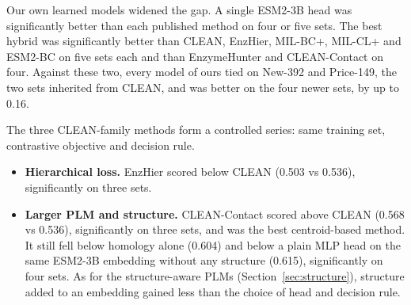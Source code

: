 \documentclass[11pt]{article}
\begin{document}
Our own learned models widened the gap. A single ESM2-3B head was significantly better than each published method on
four or five sets. The best hybrid was significantly better than CLEAN, EnzHier, MIL-BC+, MIL-CL+ and ESM2-BC on five
sets each and than EnzymeHunter and CLEAN-Contact on four. Against these two, every model of ours tied on New-392 and
Price-149, the two sets inherited from CLEAN, and was better on the four newer sets, by up to 0.16.

The three CLEAN-family methods form a controlled series: same training set, contrastive objective and decision rule.
\begin{itemize}
  \item \textbf{Hierarchical loss.} EnzHier scored below CLEAN (0.503 vs 0.536), significantly on three sets.
  \item \textbf{Larger PLM and structure.} CLEAN-Contact scored above CLEAN (0.568 vs 0.536), significantly on three
        sets, and was the best centroid-based method. It still fell below homology alone (0.604) and below a plain MLP
        head on the same ESM2-3B embedding without any structure (0.615), significantly on four sets. As for the
        structure-aware PLMs (Section~\ref{sec:structure}), structure added to an embedding gained less than the
        choice of head and decision rule.
\end{itemize}
\end{document}
